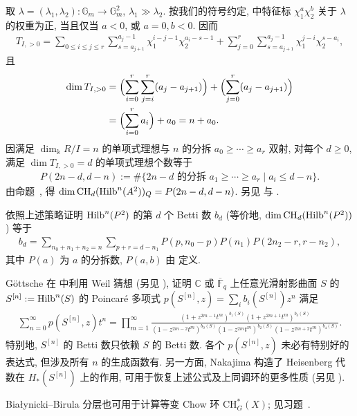 \begin{example}
取 $\lambda=(\lambda_1,\lambda_2):\mathbb G_m\to\mathbb G_m^2$, $\lambda_1\gg\lambda_2$. 按我们的符号约定,  中特征标 $\chi_1^a\chi_2^b$ 关于 $\lambda$ 的权重为正, 当且仅当 $a<0$, 或 $a=0,b<0$. 因而
\begin{align*}
T_{I,>0}=\sum_{0\le i\le j\le r}\sum_{s=a_{j+1}}^{a_j-1}\chi_1^{i-j-1}\chi_2^{a_i-s-1}+\sum_{j=0}^r\sum_{s=a_{j+1}}^{a_j-1}\chi_1^{j-i}\chi_2^{s-a_i},
\end{align*}
且
\begin{align*}
\dim T_{I,>0}&=\Bigl(\sum_{i=0}^r\sum_{j=i}^r(a_j-a_{j+1})\Bigr)+\Bigl(\sum_{j=0}^r(a_j-a_{j+1})\Bigr)\\
&=\Bigl(\sum_{i=0}^ra_i\Bigr)+a_0=n+a_0.
\end{align*}
因满足 $\dim_{\Bbbk}R/I=n$ 的单项式理想与 $n$ 的分拆 $a_0\ge\cdots\ge a_r$ 双射, 对每个 $d\ge0$, 满足 $\dim T_{I,>0}=d$ 的单项式理想个数等于
\begin{align}\label{src:7.8.24}
P(2n-d,d-n):=\#\{2n-d\text{ 的分拆 }a_1\ge\cdots\ge a_r\mid a_i\le d-n\}.
\end{align}
由命题~, 得 $\dim\mathrm{CH}_d(\operatorname{Hilb}^n(A^2))_{Q}=P(2n-d,d-n)$. 另见 \cite[定理 1.1]{ES87} 与 \cite[\S2.2]{Göt94}.
\end{example}
\begin{exercise}\label{src:7.8.25}
依照上述策略证明 $\operatorname{Hilb}^n(P^2)$ 的第 $d$ 个 Betti 数 $b_d$ (等价地, $\dim\mathrm{CH}_d(\operatorname{Hilb}^n(P^2))$) 等于
\begin{align*}
b_d=\sum_{n_0+n_1+n_2=n}\sum_{p+r=d-n_1}P(p,n_0-p)P(n_1)P(2n_2-r,r-n_2),
\end{align*}
其中 $P(a)$ 为 $a$ 的分拆数, $P(a,b)$ 由  定义.
\end{exercise}
\begin{remark}\label{src:7.8.26}
Göttsche 在 \cite[定理 0.1]{Göt90} 中利用 Weil 猜想 (另见 \cite[定理 2.3.10]{Göt94}), 证明 $\mathbb C$ 或 $\overline{\mathbb F}_q$ 上任意光滑射影曲面 $S$ 的 $S^{[n]}:=\operatorname{Hilb}^n(S)$ 的 Poincaré 多项式 $p(S^{[n]},z)=\sum_i b_i(S^{[n]})z^n$ 满足
\begin{align*}
\sum_{n=0}^{\infty}p(S^{[n]},z)t^n
=\prod_{m=1}^{\infty}\frac{(1+z^{2m-1}t^m)^{b_1(S)}(1+z^{2m+1}t^m)^{b_3(S)}}{(1-z^{2m-2}t^m)^{b_0(S)}(1-z^{2m}t^m)^{b_2(S)}(1-z^{2m+2}t^m)^{b_4(S)}}.
\end{align*}
特别地, $S^{[n]}$ 的 Betti 数只依赖 $S$ 的 Betti 数. 各个 $p(S^{[n]},z)$ 未必有特别好的表达式, 但涉及所有 $n$ 的生成函数有. 另一方面, Nakajima 构造了 Heisenberg 代数在 $H_*(S^{[n]})$ 上的作用, 可用于恢复上述公式及上同调环的更多性质 \cite{Nak97} (另见 \cite{Nak99b}).
\end{remark}
Białynicki--Birula 分层也可用于计算等变 Chow 环 $\mathrm{CH}_G^*(X)$; 见习题~.
